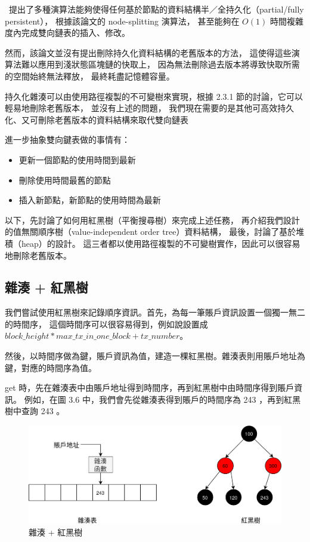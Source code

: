 ~\cite{driscoll1986making}提出了多種演算法能夠使得任何基於節點的資料結構半／全持久化（partial/fully persistent），
根據該論文的 node-splitting 演算法，
甚至能夠在 $O(1)$ 時間複雜度內完成雙向鏈表的插入、修改。

然而，該論文並沒有提出刪除持久化資料結構的老舊版本的方法，
這使得這些演算法難以應用到淺狀態區塊鏈的快取上，
因為無法刪除過去版本將導致快取所需的空間始終無法釋放，
最終耗盡記憶體容量。

持久化雜湊可以由使用路徑複製的不可變樹來實現\cite{bagwell2001ideal}，根據 2.3.1 節的討論，它可以輕易地刪除老舊版本，
並沒有上述的問題，
我們現在需要的是其他可高效持久化、又可刪除老舊版本的資料結構來取代雙向鏈表

進一步抽象雙向鍵表做的事情有：

\begin{itemize}
  \item 更新一個節點的使用時間到最新
  \item 刪除使用時間最舊的節點
  \item 插入新節點，新節點的使用時間為最新
\end{itemize}

以下，先討論了如何用紅黑樹\cite{guibas1978dichromatic}（平衡搜尋樹）來完成上述任務，
再介紹我們設計的值無關順序樹（value-independent order tree）資料結構，
最後，討論了基於堆積\cite{cormen2009introduction}（heap）的設計。
這三者都以使用路徑複製的不可變樹實作，因此可以很容易地刪除老舊版本。

\subsection{雜湊 + 紅黑樹}

我們嘗試使用紅黑樹來記錄順序資訊。首先，為每一筆賬戶資訊設置一個獨一無二的時間序，
這個時間序可以很容易得到，例如說設置成 $block\_height * max\_tx\_in\_one\_block + tx\_number$。

然後，以時間序做為鍵，賬戶資訊為值，建造一棵紅黑樹。雜湊表則用賬戶地址為鍵，對應的時間序為值。

get 時，先在雜湊表中由賬戶地址得到時間序，再到紅黑樹中由時間序得到賬戶資訊。
例如，在圖 3.6 中，我們會先從雜湊表得到賬戶的時間序為 243 ，再到紅黑樹中查詢 243 。

\begin{figure}[h!]
\includegraphics[width=\textwidth]{雜湊紅黑樹}
\caption{雜湊 + 紅黑樹}
\end{figure}

